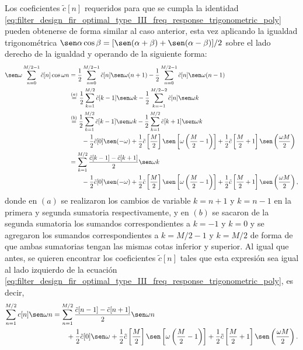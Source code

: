 \documentclass[a4paper]{report}
\begin{document}
Los coeficientes \(\tilde{c}[n]\) requeridos para que se cumpla la identidad \ref{eq:filter_design_fir_optimal_type_III_freq_response_trigonometric_poly} pueden obtenerse de forma similar al caso anterior, esta vez aplicando la igualdad trigonométrica \(\sen\alpha\cos\beta=[\sen(\alpha+\beta)+\sen(\alpha-\beta)]/2\) sobre el lado derecho de la igualdad y operando de la siguiente forma:
\begin{align*}
 \sen\omega\sum_{n=0}^{M/2-1}\tilde{c}[n]\cos\omega n
   &=\frac{1}{2}\sum_{n=0}^{M/2-1}\tilde{c}[n]\sen\omega(n+1)-\frac{1}{2}\sum_{n=0}^{M/2-1}\tilde{c}[n]\sen\omega(n-1)\\
   &\overset{(a)}{=}\frac{1}{2}\sum_{k=1}^{M/2}\tilde{c}[k-1]\sen\omega k-\frac{1}{2}\sum_{k=-1}^{M/2-2}\tilde{c}[n]\sen\omega k\\
   &\overset{(b)}{=}\frac{1}{2}\sum_{k=1}^{M/2}\tilde{c}[k-1]\sen\omega k-\frac{1}{2}\sum_{k=1}^{M/2}\tilde{c}[k+1]\sen\omega k\\
   &\qquad-\frac{1}{2}\tilde{c}[0]\sen(-\omega)+\frac{1}{2}\tilde{c}\left[\frac{M}{2}\right]\sen\left[\omega\left(\frac{M}{2}-1\right)\right]+\frac{1}{2}\tilde{c}\left[\frac{M}{2}+1\right]\sen\left(\frac{\omega M}{2}\right)\\
   &=\sum_{k=1}^{M/2}\frac{\tilde{c}[k-1]-\tilde{c}[k+1]}{2}\sen\omega k\\
   &\qquad-\frac{1}{2}\tilde{c}[0]\sen(-\omega)+\frac{1}{2}\tilde{c}\left[\frac{M}{2}\right]\sen\left[\omega\left(\frac{M}{2}-1\right)\right]+\frac{1}{2}\tilde{c}\left[\frac{M}{2}+1\right]\sen\left(\frac{\omega M}{2}\right),
\end{align*}
donde en \((a)\) se realizaron los cambios de variable \(k=n+1\) y \(k=n-1\) en la primera y segunda sumatoria respectivamente, y en \((b)\) se sacaron de la segunda sumatoria los sumandos correspondientes a \(k=-1\) y \(k=0\) y se agregaron los sumandos correspondientes a \(k=M/2-1\) y \(k=M/2\) de forma  de que ambas sumatorias tengan las mismas cotas inferior y superior. Al igual que antes, se quieren encontrar los coeficientes \(\tilde{c}[n]\) tales que esta expresión sea igual al lado izquierdo de la ecuación \ref{eq:filter_design_fir_optimal_type_III_freq_response_trigonometric_poly}, es decir,
\begin{align*}
 \sum_{n=1}^{M/2}c[n]\sen\omega n&=\sum_{n=1}^{M/2}\frac{\tilde{c}[n-1]-\tilde{c}[n+1]}{2}\sen\omega n\\
 &\qquad+\frac{1}{2}\tilde{c}[0]\sen\omega+\frac{1}{2}\tilde{c}\left[\frac{M}{2}\right]\sen\left[\omega\left(\frac{M}{2}-1\right)\right]+\frac{1}{2}\tilde{c}\left[\frac{M}{2}+1\right]\sen\left(\frac{\omega M}{2}\right). 
\end{align*}
\end{document}
